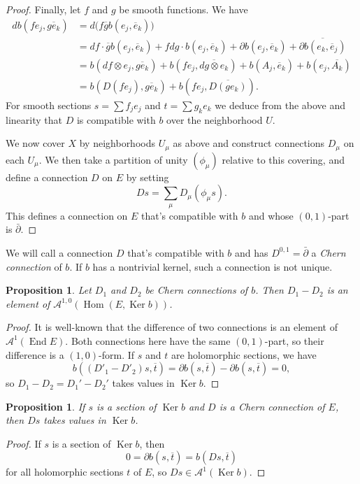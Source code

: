\documentclass[10pt,a4paper]{article}
\newtheorem{prop}[theo]{Proposition}
\newtheorem*{proof}{Proof}
\newcommand{\cc}[1]{\mathcal{#1}}
\def\ov#1{\overline{#1}}
\DeclareMathOperator{\Ker}{Ker}
\DeclareMathOperator{\End}{End}
\DeclareMathOperator{\Hom}{Hom}
\begin{document}
\begin{proof}
Finally, let $f$ and $g$ be smooth functions. We have
\begin{align*}
d b(fe_j, \ov{ge_k})
&= d\bigl(f \ov g b(e_j, \ov e_k) \bigr)
\\
&= df \cdot \ov g b(e_j, \ov e_k)
+ f dg \cdot b(e_j, \ov e_k)
+ \partial b(e_j, \ov e_k)
+ \ov{\partial b(e_k, \ov e_j)}
\\
&= b(df \otimes e_j, \ov{ge_k})
+ b(f e_j, \ov{dg \otimes e_k})
+ b(A_j, \ov e_k)
+ b(e_j, \ov{A_k})
\\
&= b(D(f e_j), \ov{ge_k}) + b(f e_j, \ov{D(g e_k)}).
\end{align*}
For smooth sections $s = \sum f_j e_j$ and $t = \sum g_k e_k$ we deduce from the above and linearity that $D$ is compatible with $b$ over the neighborhood $U$.

We now cover $X$ by neighborhoods $U_\mu$ as above and construct connections $D_\mu$ on each $U_\mu$. We then take a partition of unity $(\phi_\mu)$ relative to this covering, and define a connection $D$ on $E$ by setting
\[
D s = \sum_\mu D_\mu(\phi_\mu s).
\]
This defines a connection on $E$ that's compatible with $b$ and whose $(0,1)$-part is $\bar\partial$.
\end{proof}



We will call a connection $D$ that's compatible with $b$ and has $D^{0,1} = \bar\partial$ a \emph{Chern connection} of $b$. If $b$ has a nontrivial kernel, such a connection is not unique.


\begin{prop}
Let $D_1$ and $D_2$ be Chern connections of $b$. Then $D_1 - D_2$ is an element of $\cc A^{1,0}(\Hom(E, \Ker b))$.
\end{prop}

\begin{proof}
It is well-known that the difference of two connections is an element of $\cc A^1(\End E)$. Both connections here have the same $(0,1)$-part, so their difference is a $(1,0)$-form. If $s$ and $t$ are holomorphic sections, we have
\[
b((D'_1 - D'_2)s, \ov t)
= \partial b(s, \ov t) - \partial b(s, \ov t) = 0,
\]
so $D_1 - D_2 = D_1' - D_2'$ takes values in $\Ker b$.
\end{proof}


\begin{prop}
If $s$ is a section of $\Ker b$ and $D$ is a Chern connection of $E$, then $Ds$ takes values in $\Ker b$.
\end{prop}

\begin{proof}
If $s$ is a section of $\Ker b$, then
\[
0
= \partial b(s, \ov t)
= b(Ds, \ov t)
\]
for all holomorphic sections $t$ of $E$, so $D s \in \cc A^1(\Ker b)$.
\end{proof}
\end{document}
